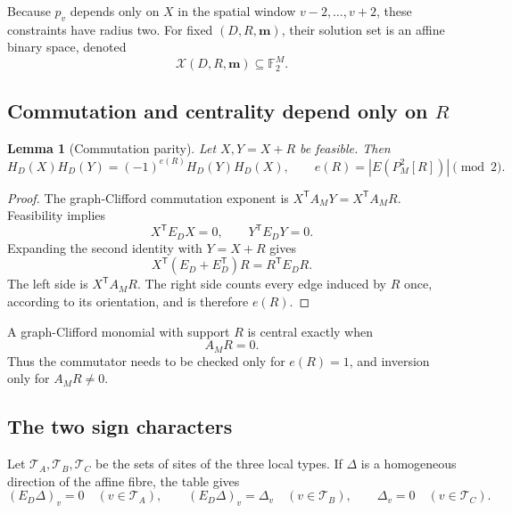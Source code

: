 \documentclass[10pt,letterpaper]{article}
\newtheorem{lemma}[theorem]{Lemma}
\newcommand{\Xfib}{\mathcal X}
\newcommand{\FF}{\mathbb F_2}
\begin{document}
Because \(p_v\) depends only on \(X\) in the spatial window \(v-2,\ldots,v+2\), these constraints have radius two.  For fixed \((D,R,\bm m)\), their solution set is an affine binary space, denoted
\begin{equation}\label{eq:fibre}
 \Xfib(D,R,\bm m)\subseteq\FF^M.
\end{equation}

\subsection{Commutation and centrality depend only on \texorpdfstring{$R$}{R}}

\begin{lemma}[Commutation parity]\label{lem:comm-parity}
Let \(X,Y=X+R\) be feasible.  Then
\begin{equation}\label{eq:comm-parity-R}
 H_D(X)H_D(Y)=(-1)^{e(R)}H_D(Y)H_D(X),
 \qquad
 e(R)=|E(P_M^2[R])|\pmod2.
\end{equation}
\end{lemma}

\begin{proof}
The graph-Clifford commutation exponent is \(X^{\mathsf T}A_MY=X^{\mathsf T}A_MR\).  Feasibility implies
\[
 X^{\mathsf T}E_DX=0,
 \qquad
 Y^{\mathsf T}E_DY=0.
\]
Expanding the second identity with \(Y=X+R\) gives
\[
 X^{\mathsf T}(E_D+E_D^{\mathsf T})R=R^{\mathsf T}E_DR.
\]
The left side is \(X^{\mathsf T}A_MR\).  The right side counts every edge induced by \(R\) once, according to its orientation, and is therefore \(e(R)\).
\end{proof}

A graph-Clifford monomial with support \(R\) is central exactly when
\begin{equation}\label{eq:central-R}
 A_MR=0.
\end{equation}
Thus the commutator needs to be checked only for \(e(R)=1\), and inversion only for \(A_MR\ne0\).

\subsection{The two sign characters}

Let \(\mathcal T_A,\mathcal T_B,\mathcal T_C\) be the sets of sites of the three local types.  If \(\Delta\) is a homogeneous direction of the affine fibre, the table gives
\begin{equation}\label{eq:direction-equations}
 (E_D\Delta)_v=0\quad(v\in\mathcal T_A),
 \qquad
 (E_D\Delta)_v=\Delta_v\quad(v\in\mathcal T_B),
 \qquad
 \Delta_v=0\quad(v\in\mathcal T_C).
\end{equation}
\end{document}
